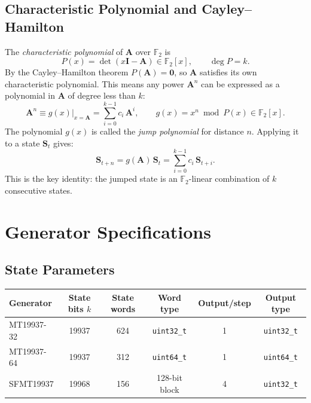 \documentclass{article}
\begin{document}
\subsection{Characteristic Polynomial and Cayley--Hamilton}

The \emph{characteristic polynomial} of $\mathbf{A}$ over $\mathbb{F}_2$ is
\begin{equation}
  P(x) = \det(x\mathbf{I} - \mathbf{A}) \in \mathbb{F}_2[x], \qquad \deg P = k.
\end{equation}
By the Cayley--Hamilton theorem $P(\mathbf{A}) = \mathbf{0}$, so $\mathbf{A}$ satisfies its
own characteristic polynomial.  This means any power $\mathbf{A}^n$ can be expressed as a
polynomial in $\mathbf{A}$ of degree less than $k$:
\begin{equation}
  \mathbf{A}^n \equiv g(x)\big|_{x=\mathbf{A}} = \sum_{i=0}^{k-1} c_i\,\mathbf{A}^i,
  \qquad g(x) = x^n \bmod P(x) \in \mathbb{F}_2[x].
  \label{eq:jump_poly}
\end{equation}
The polynomial $g(x)$ is called the \emph{jump polynomial} for distance $n$.  Applying it
to a state $\mathbf{S}_t$ gives:
\begin{equation}
  \mathbf{S}_{t+n} = g(\mathbf{A})\,\mathbf{S}_t = \sum_{i=0}^{k-1} c_i\,\mathbf{S}_{t+i}.
  \label{eq:apply}
\end{equation}
This is the key identity: the jumped state is an $\mathbb{F}_2$-linear combination of $k$
consecutive states.

\section{Generator Specifications}
\label{sec:generators}

\subsection{State Parameters}

\begin{center}
\begin{tabular}{lccccc}
\toprule
Generator & State bits $k$ & State words & Word type & Output/step & Output type \\
\midrule
MT19937-32 & 19937 & 624 & \texttt{uint32\_t} & 1 & \texttt{uint32\_t} \\
MT19937-64 & 19937 & 312 & \texttt{uint64\_t} & 1 & \texttt{uint64\_t} \\
SFMT19937  & 19968 & 156 & 128-bit block      & 4 & \texttt{uint32\_t} \\
\bottomrule
\end{tabular}
\end{center}
\end{document}
